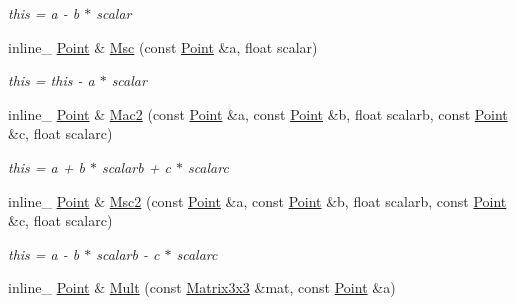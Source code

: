 \begin{DoxyCompactItemize}
\begin{DoxyCompactList}\small\item\em this = a -\/ b $\ast$ scalar \end{DoxyCompactList}\item 
inline\+\_\+ \hyperlink{classOpcode_1_1Point}{Point} \& \hyperlink{classOpcode_1_1Point_a79084448ee10724aed66cfbccd6eec24}{Msc} (const \hyperlink{classOpcode_1_1Point}{Point} \&a, float scalar)\hypertarget{classOpcode_1_1Point_a79084448ee10724aed66cfbccd6eec24}{}\label{classOpcode_1_1Point_a79084448ee10724aed66cfbccd6eec24}

\begin{DoxyCompactList}\small\item\em this = this -\/ a $\ast$ scalar \end{DoxyCompactList}\item 
inline\+\_\+ \hyperlink{classOpcode_1_1Point}{Point} \& \hyperlink{classOpcode_1_1Point_a2e1b560f70bc139c6333dfcfa259c2c2}{Mac2} (const \hyperlink{classOpcode_1_1Point}{Point} \&a, const \hyperlink{classOpcode_1_1Point}{Point} \&b, float scalarb, const \hyperlink{classOpcode_1_1Point}{Point} \&c, float scalarc)\hypertarget{classOpcode_1_1Point_a2e1b560f70bc139c6333dfcfa259c2c2}{}\label{classOpcode_1_1Point_a2e1b560f70bc139c6333dfcfa259c2c2}

\begin{DoxyCompactList}\small\item\em this = a + b $\ast$ scalarb + c $\ast$ scalarc \end{DoxyCompactList}\item 
inline\+\_\+ \hyperlink{classOpcode_1_1Point}{Point} \& \hyperlink{classOpcode_1_1Point_a64849295ca7898daa1d517ddadeab7eb}{Msc2} (const \hyperlink{classOpcode_1_1Point}{Point} \&a, const \hyperlink{classOpcode_1_1Point}{Point} \&b, float scalarb, const \hyperlink{classOpcode_1_1Point}{Point} \&c, float scalarc)\hypertarget{classOpcode_1_1Point_a64849295ca7898daa1d517ddadeab7eb}{}\label{classOpcode_1_1Point_a64849295ca7898daa1d517ddadeab7eb}

\begin{DoxyCompactList}\small\item\em this = a -\/ b $\ast$ scalarb -\/ c $\ast$ scalarc \end{DoxyCompactList}\item 
inline\+\_\+ \hyperlink{classOpcode_1_1Point}{Point} \& \hyperlink{classOpcode_1_1Point_a15dbdfc1415414ffc5fdb4d1892ebacc}{Mult} (const \hyperlink{classOpcode_1_1Matrix3x3}{Matrix3x3} \&mat, const \hyperlink{classOpcode_1_1Point}{Point} \&a)\hypertarget{classOpcode_1_1Point_a15dbdfc1415414ffc5fdb4d1892ebacc}{}\label{classOpcode_1_1Point_a15dbdfc1415414ffc5fdb4d1892ebacc}


\end{DoxyCompactItemize}
